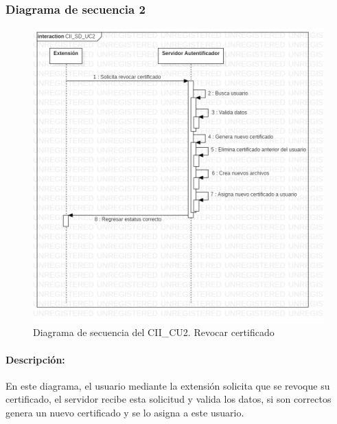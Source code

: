 \documentclass[12pt, a4paper, titlepage]{report}
\begin{document}
    		    \subsubsection{Diagrama de secuencia 2}
            	\begin{figure}[H]
    			    \begin{center} \includegraphics[width=12cm]{./imagenes/Disenio/Componente_2/CII_SD_UC2.png}
    			    \caption[Diagrama de secuencia 2 del Componente II]{Diagrama de secuencia del CII\_CU2. Revocar certificado}
    		        \end{center}
    		    \end{figure}
    		    
    		    \paragraph{Descripción:} En este diagrama, el usuario mediante la extensión solicita que se revoque su certificado, el servidor recibe esta solicitud y valida los datos, si son correctos genera un nuevo certificado y se lo asigna a este usuario.
    		    
\end{document}
